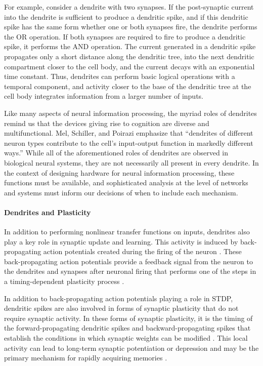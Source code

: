 For example, consider a dendrite with two synapses. If the post-synaptic current into the dendrite is sufficient to produce a dendritic spike, and if this dendritic spike has the same form whether one or both synapses fire, the dendrite performs the OR operation. If both synapses are required to fire to produce a dendritic spike, it performs the AND operation. The current generated in a dendritic spike propagates only a short distance along the dendritic tree, into the next dendritic compartment closer to the cell body, and the current decays with an exponential time constant. Thus, dendrites can perform basic logical operations with a temporal component, and activity closer to the base of the dendritic tree at the cell body integrates information from a larger number of inputs. 

Like many aspects of neural information processing, the myriad roles of dendrites remind us that the devices giving rise to cognition are diverse and multifunctional. Mel, Schiller, and Poirazi emphasize that ``dendrites of different neuron types contribute to the cell's input-output function in markedly different ways.'' \cite{mesc2017} While all of the aforementioned roles of dendrites are observed in biological neural systems, they are not necessarily all present in every dendrite. In the context of designing hardware for neural information processing, these functions must be available, and sophisticated analysis at the level of networks and systems must inform our decisions of when to include each mechanism.

\cite{pome2001}


\paragraph{\label{sec:dendrites_and_plasticity}Dendrites and Plasticity}
In addition to performing nonlinear transfer functions on inputs, dendrites also play a key role in synaptic update and learning. This activity is induced by back-propagating action potentials created during the firing of the neuron \cite{majo2005}. These back-propagating action potentials provide a feedback signal from the neuron to the dendrites and synapses after neuronal firing that performs one of the steps in a timing-dependent plasticity process \cite{nesa2004}.

In addition to back-propagating action potentials playing a role in STDP, dendritic spikes are also involved in forms of synaptic plasticity that do not require synaptic activity. In these forms of synaptic plasticity, it is the timing of the forward-propagating dendritic spikes and backward-propagating spikes that establish the conditions in which synaptic weights can be modified \cite{hoko2004}. This local activity can lead to long-term synaptic potentiation or depression and may be the primary mechanism for rapidly acquiring memories \cite{hoko2006}.

